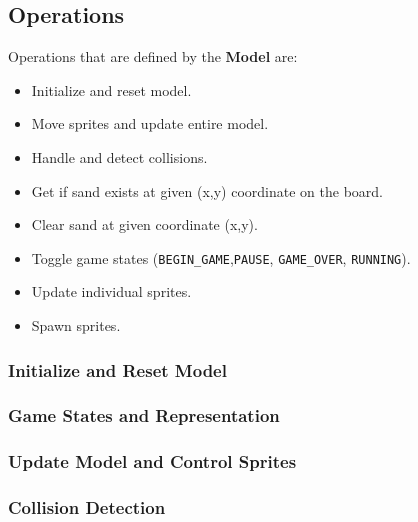     \subsection{Operations}

    Operations that are defined by the \textbf{Model} are:

    \begin{itemize}
      \item Initialize and reset model.
      \item Move sprites and update entire model.
      \item Handle and detect collisions.
      \item Get if sand exists at given (x,y) coordinate on the board.
      \item Clear sand at given coordinate (x,y).
      \item Toggle game states (\texttt{BEGIN\_GAME},\texttt{PAUSE}, \texttt{GAME\_OVER}, \texttt{RUNNING}).
      \item Update individual sprites.
      \item Spawn sprites.
    \end{itemize}

    \subsubsection{Initialize and Reset Model}

    \subsubsection{Game States and Representation}

    \subsubsection{Update Model and Control Sprites}

    \subsubsection{Collision Detection}



